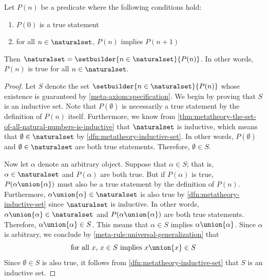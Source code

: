 \begin{thm}
     \label{thm:metatheory-weak-induction}
    Let \( P(n) \) be a predicate where the following conditions hold:
    \begin{enumerate}[topsep=2pt,label=\textup{\texttt{(\alph*)}}]
        \item \( P(0) \) is a true statement
        \item for all \( n \in \naturalset \), \( P(n) \) implies \( P(n + 1) \)
    \end{enumerate}
    Then  \( \naturalset = \setbuilder{ n \in \naturalset }{P(n)} \).
    In other words, \( P(n) \) is true for all \( n \in \naturalset \).
\end{thm}

\begin{proof}
    Let \( S \) denote the set \( \setbuilder{n \in \naturalset}{P(n)} \) whose existence is guaranteed by \cref{meta-axiom:specification}.
    We begin by proving that \( S \) is an inductive set.
    Note that \( P(\emptyset) \) is necessarily a true statement by the definition of \( P(n) \) itself.
    Furthermore, we know from \cref{thm:metatheory-the-set-of-all-natural-numbers-is-inductive} that \( \naturalset \) is inductive,
    which means that \( \emptyset \in \naturalset \) by \cref{dfn:metatheory-inductive-set}.
    In other words, \( P(\emptyset) \) and \( \emptyset \in \naturalset \) are both true statements.
    Therefore, \( \emptyset \in S \).

    \vspace{0.3cm}
    \noindent
    Now let \( \alpha \) denote an arbitrary object.
    Suppose that \( \alpha \in S \); that is, \( \alpha \in \naturalset \) and \( P(\alpha) \) are both true.
    But if \( P(\alpha) \) is true, \( P(\alpha \union \mleft\{ \alpha \mright\}) \) must also be a true statement
    by the definition of \( P(n) \).
    Furthermore, \( \alpha \union \mleft\{ \alpha \mright\} \in \naturalset \) is also true by \cref{dfn:metatheory-inductive-set}
    since \( \naturalset \) is inductive.
    In other words, \( \alpha \union \mleft\{ \alpha \mright\} \in \naturalset \) and \( P(\alpha \union \mleft\{ \alpha \mright\}) \) are both
    true statements.
    Therefore, \( \alpha \union \mleft\{ \alpha \mright\} \in S \).
    This means that \( \alpha \in S \) implies \( \alpha \union \mleft\{ \alpha \mright\} \).
    Since \( \alpha \) is arbitrary, we conclude by \cref{meta-rule:universal-generalization} that
    \begin{equation*}
        \text{for all \( x \), \( x \in S \) implies \( x \union \mleft\{ x \mright\} \in S \)}
    \end{equation*}
    Since \( \emptyset \in S \) is also true, it follows from \cref{dfn:metatheory-inductive-set} that \( S \) is an inductive set.


\end{proof}
